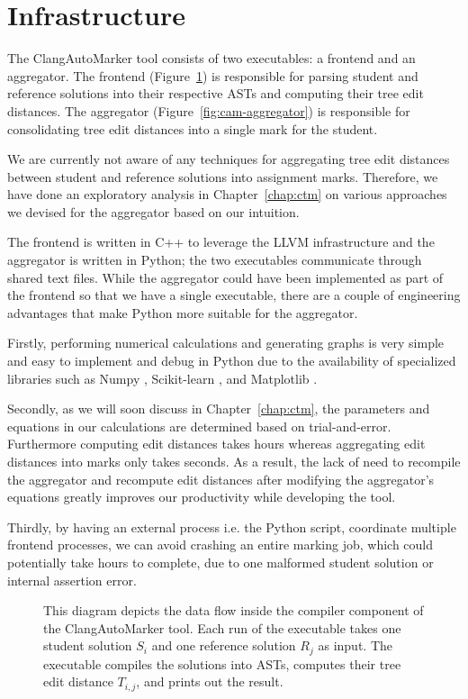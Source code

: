 \section{Infrastructure}

The ClangAutoMarker tool consists of two executables: a frontend and an aggregator. The frontend (Figure~\ref{fig:cam-compiler}) is responsible for parsing student and reference solutions into their respective ASTs and computing their tree edit distances. The aggregator (Figure~\ref{fig:cam-aggregator}) is responsible for consolidating tree edit distances into a single mark for the student.

We are currently not aware of any techniques for aggregating tree edit distances between student and reference solutions into assignment marks. Therefore, we have done an exploratory analysis in Chapter~\ref{chap:ctm} on various approaches we devised for the aggregator based on our intuition.

The frontend is written in C++ to leverage the LLVM infrastructure and the aggregator is written in Python; the two executables communicate through shared text files. While the aggregator could have been implemented as part of the frontend so that we have a single executable, there are a couple of engineering advantages that make Python more suitable for the aggregator.

Firstly, performing numerical calculations and generating graphs is very simple and easy to implement and debug in Python due to the availability of specialized libraries such as Numpy \cite{lib-numpy}, Scikit-learn \cite{lib-scikit}, and Matplotlib \cite{lib-matplotlib}.

Secondly, as we will soon discuss in Chapter~\ref{chap:ctm}, the parameters and equations in our calculations are determined based on trial-and-error. Furthermore computing edit distances takes hours whereas aggregating edit distances into marks only takes seconds. As a result, the lack of need to recompile the aggregator and recompute edit distances after modifying the aggregator's equations greatly improves our productivity while developing the tool.

Thirdly, by having an external process i.e. the Python script, coordinate multiple frontend processes, we can avoid crashing an entire marking job, which could potentially take hours to complete, due to one malformed student solution or internal assertion error.

\begin{figure}

\vspace*{0.5cm}
\caption[Compiler Component of ClangAutoMarker]{This diagram depicts the data flow inside the compiler component of the ClangAutoMarker tool. Each run of the executable takes one student solution $S_i$ and one reference solution $R_j$ as input. The executable compiles the solutions into ASTs, computes their tree edit distance $T_{i,j}$, and prints out the result.}
\label{fig:cam-compiler}
\end{figure}

